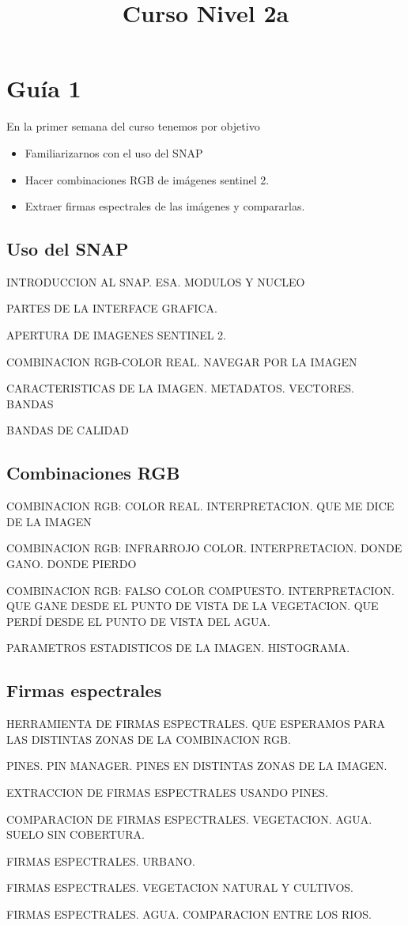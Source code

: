 \documentclass[a4paper]{book}
\title{Curso Nivel 2a}
\begin{document}
\chapter{Guía 1}
En la primer semana del curso tenemos por objetivo
\begin{itemize}
    \item Familiarizarnos con el uso del SNAP
    \item Hacer combinaciones RGB de imágenes sentinel 2.
    \item Extraer firmas espectrales de las imágenes y compararlas.
\end{itemize}

\section{Uso del SNAP}

INTRODUCCION AL SNAP. ESA. MODULOS Y NUCLEO

PARTES DE LA INTERFACE GRAFICA.

APERTURA DE IMAGENES SENTINEL 2.

COMBINACION RGB-COLOR REAL. NAVEGAR POR LA IMAGEN

CARACTERISTICAS DE LA IMAGEN. METADATOS. VECTORES. BANDAS

BANDAS DE CALIDAD

\section{Combinaciones RGB}

COMBINACION RGB: COLOR REAL. INTERPRETACION. QUE ME DICE DE LA IMAGEN

COMBINACION RGB: INFRARROJO COLOR. INTERPRETACION. DONDE GANO. DONDE PIERDO

COMBINACION RGB: FALSO COLOR COMPUESTO. INTERPRETACION. QUE GANE DESDE EL PUNTO DE VISTA DE LA VEGETACION. QUE PERDÍ DESDE EL PUNTO DE VISTA DEL AGUA.

PARAMETROS ESTADISTICOS DE LA IMAGEN. HISTOGRAMA.

\section{Firmas espectrales}

HERRAMIENTA DE FIRMAS ESPECTRALES. QUE ESPERAMOS PARA LAS DISTINTAS ZONAS DE LA COMBINACION RGB.

PINES. PIN MANAGER. PINES EN DISTINTAS ZONAS DE LA IMAGEN.

EXTRACCION DE FIRMAS ESPECTRALES USANDO PINES.

COMPARACION DE FIRMAS ESPECTRALES. VEGETACION. AGUA. SUELO SIN COBERTURA.

FIRMAS ESPECTRALES. URBANO.

FIRMAS ESPECTRALES. VEGETACION NATURAL Y CULTIVOS.

FIRMAS ESPECTRALES. AGUA. COMPARACION ENTRE LOS RIOS.
\end{document}
